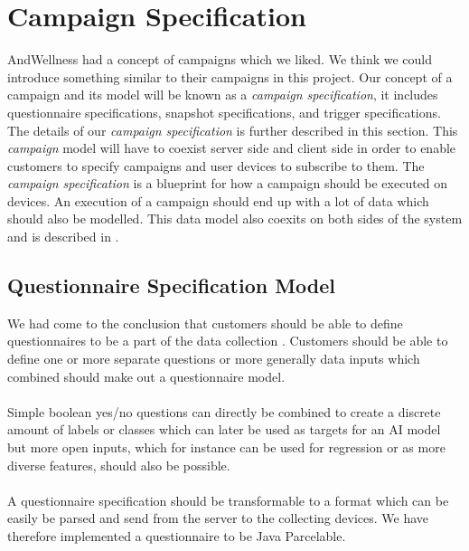 
\section{Campaign Specification}
\label{sec:campaign_specification}
AndWellness had a concept of campaigns  which we liked. We think we could introduce something similar to their campaigns in this project. Our concept of a campaign and its model will be known as a \textit{campaign specification}, it includes questionnaire specifications, snapshot specifications, and trigger specifications. The details of our \textit{campaign specification} is further described in this section. This \textit{campaign} model will have to coexist server side and client side in order to enable customers to specify campaigns and user devices to subscribe to them. The \textit{campaign specification} is a blueprint for how a campaign should be executed on devices. An execution of a campaign should end up with a lot of data which should also be modelled. This data model also coexits on both sides of the system and is described in .

\subsection{Questionnaire Specification Model}
\label{sub:questionnaire_model}
We had come to the conclusion that customers should be able to define questionnaires to be a part of the data collection . Customers should be able to define one or more separate questions or more generally data inputs which combined should make out a questionnaire model. 
\\\\
Simple boolean yes/no questions can directly be combined to create a discrete amount of labels or classes which can later be used as targets for an AI model but more open inputs, which for instance can be used for regression or as more diverse features, should also be possible. 
\\\\
A questionnaire specification should be transformable to a format which can be easily be parsed and send from the server to the collecting devices. We have therefore implemented a questionnaire to be Java Parcelable. 

